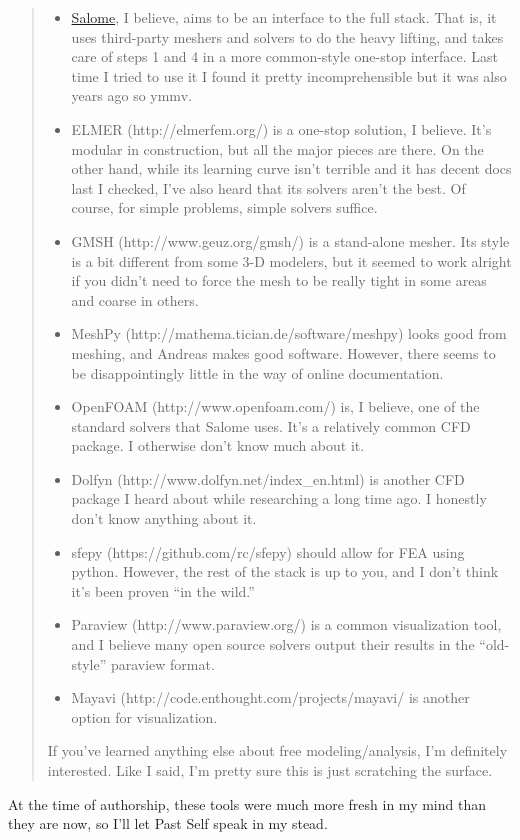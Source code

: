 \begin{quote}
\begin{itemize}
\item
  \href{http://www.salome-platform.org/}{Salome}, I believe, aims to be
  an interface to the full stack. That is, it uses third-party meshers
  and solvers to do the heavy lifting, and takes care of steps 1 and 4
  in a more common-style one-stop interface. Last time I tried to use it
  I found it pretty incomprehensible but it was also years ago so ymmv.
\item
  ELMER (http://elmerfem.org/) is a one-stop solution, I believe.
  It's modular in construction, but all the major pieces are there. On
  the other hand, while its learning curve isn't terrible and it has
  decent docs last I checked, I've also heard that its solvers aren't
  the best. Of course, for simple problems, simple solvers suffice.
\item
  GMSH (http://www.geuz.org/gmsh/) is a stand-alone mesher. Its
  style is a bit different from some 3-D modelers, but it seemed to work
  alright if you didn't need to force the mesh to be really tight in
  some areas and coarse in others.
\item
  MeshPy (http://mathema.tician.de/software/meshpy) looks good
  from meshing, and Andreas makes good software. However, there seems to
  be disappointingly little in the way of online documentation.
\item
  OpenFOAM (http://www.openfoam.com/) is, I believe, one of the
  standard solvers that Salome uses. It's a relatively common CFD
  package. I otherwise don't know much about it.
\item
  Dolfyn (http://www.dolfyn.net/index\_en.html) is another CFD
  package I heard about while researching a long time ago. I honestly
  don't know anything about it.
\item
  sfepy (https://github.com/rc/sfepy) should allow for FEA using
  python. However, the rest of the stack is up to you, and I don't think
  it's been proven ``in the wild.''
\item
  Paraview (http://www.paraview.org/) is a common visualization
  tool, and I believe many open source solvers output their results in
  the ``old-style'' paraview format.
\item
  Mayavi (http://code.enthought.com/projects/mayavi/ is another
  option for visualization.
\end{itemize}
If you've learned anything else about free modeling/analysis, I'm
definitely interested. Like I said, I'm pretty sure this is just
scratching the surface.

\end{quote}
At the time of authorship, these tools were much more fresh in my mind
than they are now, so I'll let Past Self speak in my stead.

